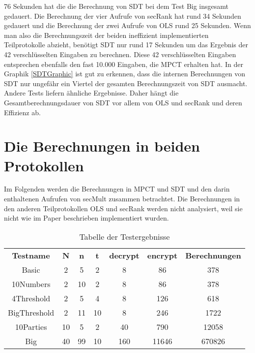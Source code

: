 76 Sekunden hat die die Berechnung von SDT bei dem Test Big insgesamt gedauert. Die Berechnung der vier Aufrufe von secRank hat rund 34 Sekunden gedauert und die Berechnung der zwei Aufrufe von OLS rund 25 Sekunden. Wenn man also die Berechnungszeit der beiden ineffizient implementierten Teilprotokolle abzieht, benötigt SDT nur rund 17 Sekunden um das Ergebnis der 42 verschlüsselten Eingaben zu berechnen. Diese 42 verschlüsselten Eingaben entsprechen ebenfalls den fast 10.000 Eingaben, die MPCT erhalten hat. In der Graphik \ref{SDTGraphic} ist gut zu erkennen, dass die internen Berechnungen von SDT nur ungefähr ein Viertel der gesamten Berechnungszeit von SDT ausmacht. Andere Tests liefern ähnliche Ergebnisse. Daher hängt die Gesamtberechnungsdauer von SDT vor allem von OLS und secRank und deren Effizienz ab.

\section{Die Berechnungen in beiden Protokollen}
Im Folgenden werden die Berechnungen in MPCT und SDT und den darin enthaltenen Aufrufen von secMult zusammen betrachtet. 
Die Berechnungen in den anderen Teilprotokollen OLS und secRank werden nicht analysiert, weil sie nicht wie im Paper \cite{Doettling2021} beschrieben implementiert wurden.

   \begin{table}[!h]
     \centering
     \begin{tabular}{c|ccc|ccc}
       \textbf{Testname} & \textbf{N} & \textbf{n} & \textbf{t} & \textbf{decrypt} &\textbf{encrypt} & \textbf{Berechnungen}\\
       Basic & 2 & 5 & 2 & 8 & 86 & 378\\
       10Numbers & 2 & 10 & 2 & 8 & 86 & 378\\
       4Threshold & 2 & 5 & 4 & 8 & 126 & 618\\
       BigThreshold & 2 & 11 & 10 & 8 & 246 & 1722\\
       10Parties & 10 & 5 & 2 & 40 & 790 & 12058\\
       Big &40 & 99 & 10 & 160 & 11646 & 670826\\
     \end{tabular}

     \caption{Tabelle der Testergebnisse}
     \label{tbl:results}

   \end{table}

